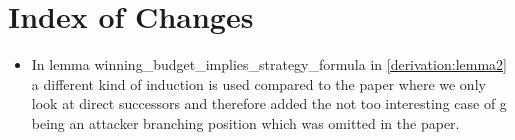 \section{Index of Changes}

\begin{itemize}
    \item  In lemma winning\_budget\_implies\_strategy\_formula in \ref{derivation:lemma2} a different kind of induction is used compared to the paper 
where we only look at direct successors and therefore added the not too interesting case of g being an 
attacker branching position which was omitted in the paper.
\end{itemize}
